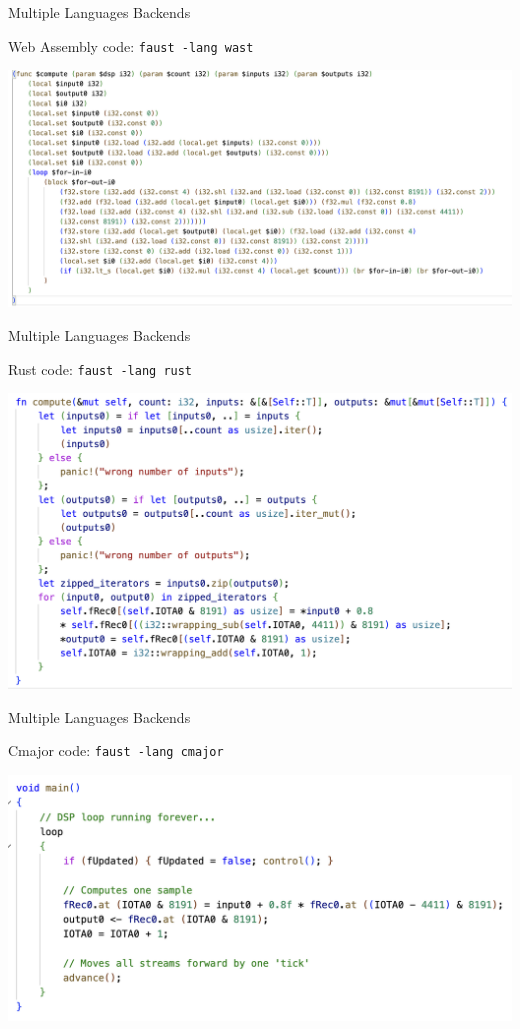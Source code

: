 \begin{frame}[fragile]{Multiple Languages Backends}
    \begin{block}{Web Assembly code: \lstinline'faust -lang wast'}
        \begin{center}
            \includegraphics[width=\textwidth,keepaspectratio=true]{images/echo-wat.png}
        \end{center}
    \end{block}
\end{frame}


\begin{frame}[fragile]{Multiple Languages Backends}
    \begin{block}{Rust code: \lstinline'faust -lang rust'}
        \begin{center}
            \includegraphics[width=\textwidth,keepaspectratio=true]{images/echo-rust.png}
        \end{center}
    \end{block}
\end{frame}


\begin{frame}[fragile]{Multiple Languages Backends}
    \begin{block}{Cmajor code: \lstinline'faust -lang cmajor'}
        \begin{center}
            \includegraphics[width=\textwidth,keepaspectratio=true]{images/echo-cmajor.png}
        \end{center}
    \end{block}
\end{frame}
